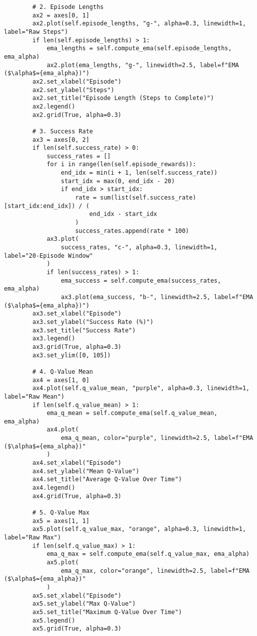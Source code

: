 \begin{verbatim}
        # 2. Episode Lengths
        ax2 = axes[0, 1]
        ax2.plot(self.episode_lengths, "g-", alpha=0.3, linewidth=1, label="Raw Steps")
        if len(self.episode_lengths) > 1:
            ema_lengths = self.compute_ema(self.episode_lengths, ema_alpha)
            ax2.plot(ema_lengths, "g-", linewidth=2.5, label=f"EMA ($\alpha$={ema_alpha})")
        ax2.set_xlabel("Episode")
        ax2.set_ylabel("Steps")
        ax2.set_title("Episode Length (Steps to Complete)")
        ax2.legend()
        ax2.grid(True, alpha=0.3)

        # 3. Success Rate
        ax3 = axes[0, 2]
        if len(self.success_rate) > 0:
            success_rates = []
            for i in range(len(self.episode_rewards)):
                end_idx = min(i + 1, len(self.success_rate))
                start_idx = max(0, end_idx - 20)
                if end_idx > start_idx:
                    rate = sum(list(self.success_rate)[start_idx:end_idx]) / (
                        end_idx - start_idx
                    )
                    success_rates.append(rate * 100)
            ax3.plot(
                success_rates, "c-", alpha=0.3, linewidth=1, label="20-Episode Window"
            )
            if len(success_rates) > 1:
                ema_success = self.compute_ema(success_rates, ema_alpha)
                ax3.plot(ema_success, "b-", linewidth=2.5, label=f"EMA ($\alpha$={ema_alpha})")
        ax3.set_xlabel("Episode")
        ax3.set_ylabel("Success Rate (%)")
        ax3.set_title("Success Rate")
        ax3.legend()
        ax3.grid(True, alpha=0.3)
        ax3.set_ylim([0, 105])

        # 4. Q-Value Mean
        ax4 = axes[1, 0]
        ax4.plot(self.q_value_mean, "purple", alpha=0.3, linewidth=1, label="Raw Mean")
        if len(self.q_value_mean) > 1:
            ema_q_mean = self.compute_ema(self.q_value_mean, ema_alpha)
            ax4.plot(
                ema_q_mean, color="purple", linewidth=2.5, label=f"EMA ($\alpha$={ema_alpha})"
            )
        ax4.set_xlabel("Episode")
        ax4.set_ylabel("Mean Q-Value")
        ax4.set_title("Average Q-Value Over Time")
        ax4.legend()
        ax4.grid(True, alpha=0.3)

        # 5. Q-Value Max
        ax5 = axes[1, 1]
        ax5.plot(self.q_value_max, "orange", alpha=0.3, linewidth=1, label="Raw Max")
        if len(self.q_value_max) > 1:
            ema_q_max = self.compute_ema(self.q_value_max, ema_alpha)
            ax5.plot(
                ema_q_max, color="orange", linewidth=2.5, label=f"EMA ($\alpha$={ema_alpha})"
            )
        ax5.set_xlabel("Episode")
        ax5.set_ylabel("Max Q-Value")
        ax5.set_title("Maximum Q-Value Over Time")
        ax5.legend()
        ax5.grid(True, alpha=0.3)


\end{verbatim}
